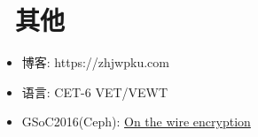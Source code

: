 \documentclass{resume}
\begin{document}
\section{\faCogs\ 其他}
\begin{itemize}[parsep=0.5ex]
  \item 博客: https://zhjwpku.com
  \item 语言: CET-6 VET/VEWT
  \item GSoC2016(Ceph): \href{https://gist.github.com/zhjwpku/1bc4202671ed06c799f0bf4739416429}{On the wire encryption}
\end{itemize}
\end{document}
